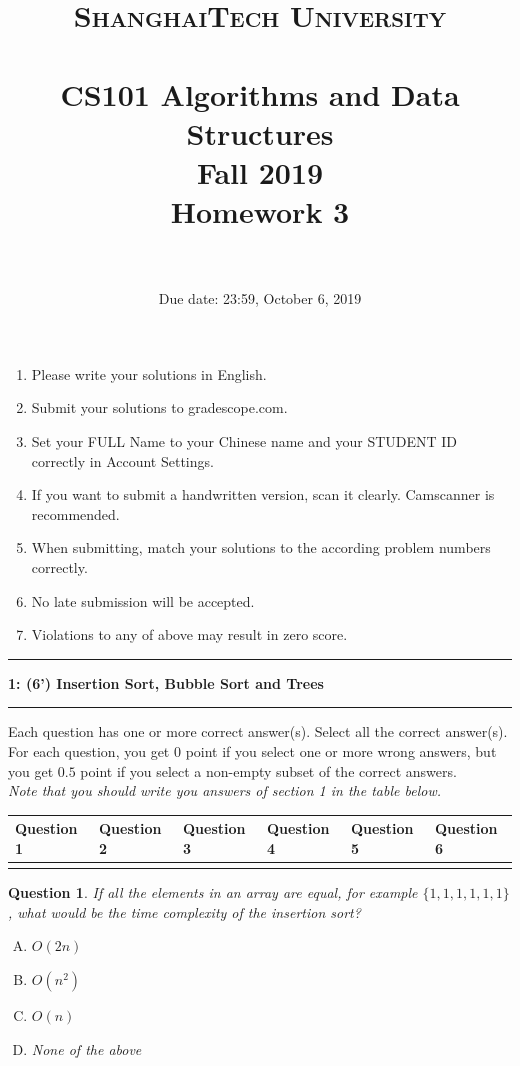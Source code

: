 \documentclass[10.5pt]{article}
\title{
	\normalfont \normalsize
	\textsc{ShanghaiTech University} \\ [25pt]
	\horrule{0.5pt} \\[0.4cm] %
	\huge CS101 Algorithms and Data Structures\\ %
	\LARGE Fall 2019\\
	\LARGE Homework 3\\
	\horrule{2pt} \\[0.5cm] %
}
\author{}
\date{Due date: 23:59, October 6, 2019}
\newcommand\question[2]{\vspace{.25in}\hrule\textbf{#1: #2}\vspace{.5em}\hrule\vspace{.10in}}
\newtheorem{Q}{Question}
\begin{document}
	\maketitle
	\thispagestyle{firstpage}
	\vspace{3ex}
	
	\begin{enumerate}
		\item Please write your solutions in English. 
		
		\item Submit your solutions to gradescope.com.  
		
		\item Set your FULL Name to your Chinese name and your STUDENT ID correctly in Account Settings. 
		
		\item If you want to submit a handwritten version, scan it clearly. Camscanner is recommended. 
		
		\item When submitting, match your solutions to the according problem numbers correctly. 
		
		\item No late submission will be accepted.
		
		\item Violations to any of above may result in zero score. 
	\end{enumerate}
	\newpage
	
	\question{1}{(6') Insertion Sort, Bubble Sort and Trees}
	Each question has one or more correct answer(s). Select all the correct answer(s). For each question, you get $0$ point if you select one or more wrong answers, but you get $0.5$ point if you select a non-empty subset of the correct answers.\\
	\textit{Note that you should write you answers of section 1 in the table below.}
	\begin{table}[htbp]
		\begin{tabular}{|p{2cm}|p{2cm}|p{2cm}|p{2cm}|p{2cm}|p{2cm}|}
			\hline 
			Question 1 & Question 2 & Question 3 & Question 4 & Question 5 &  Question 6  \\
			\hline 
			& & & & & \\ 
			\hline 
		\end{tabular} 
	\end{table}
	
	\begin{Q}
		If all the elements in an array are equal, for example $\{1,1,1,1,1,1\}$, what would be the time complexity of the insertion sort?
		\begin{enumerate}[(A)]
			\item $O(2n)$
			\item $O(n^2)$
			\item $O(n)$
			\item None of the above
		\end{enumerate}
	\end{Q}
	
\end{document}
